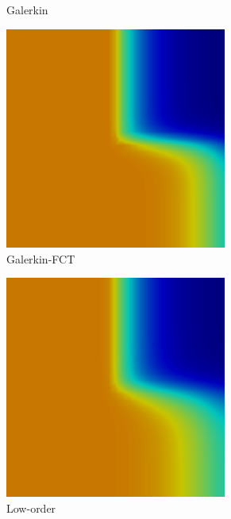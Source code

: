 \begin{frame}
\begin{figure}[h]
\begin{subfigure}{0.3\textwidth}
      \caption{Galerkin}
   \end{subfigure}
   \begin{subfigure}{0.3\textwidth}
      \centering
      \includegraphics[width=0.8\textwidth]{./figures/GalFCT.png}
      \caption{Galerkin-FCT}
   \end{subfigure}
   \begin{subfigure}{0.3\textwidth}
      \centering
      \includegraphics[width=0.8\textwidth]{./figures/low.png}
      \caption{Low-order}
   \end{subfigure}
   \begin{subfigure}{0.3\textwidth}

\end{subfigure}
\end{figure}
\end{frame}
